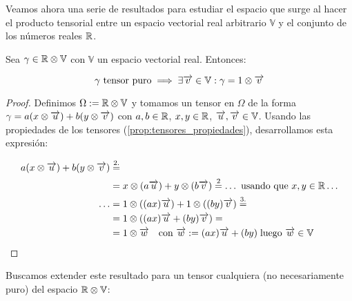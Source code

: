 Veamos ahora una serie de resultados para estudiar el espacio que surge al hacer el producto tensorial entre un espacio vectorial real arbitrario $\mathbb{V}$ y el conjunto de los números reales $\mathbb{R}$.

\begin{proposicion}
	Sea $\gamma \in \mathbb{R} \otimes \mathbb{V}$ con $\mathbb{V}$ un espacio vectorial real. Entonces:

	\begin{equation}
		\gamma \text{ tensor puro} \implies \exists \overrightarrow{v} \in \mathbb{V}: \gamma = 1 \otimes \overrightarrow{v}
	\end{equation}
\end{proposicion}

\begin{proof}
	Definimos $\Omega := \mathbb{R} \otimes \mathbb{V}$ y tomamos un tensor en $\Omega$ de la forma $\gamma = a(x \otimes \overrightarrow{u}) + b(y \otimes \overrightarrow{v})$ con $a, b \in \mathbb{R}$, $x, y \in \mathbb{R}$, $\overrightarrow{u}, \overrightarrow{v} \in \mathbb{V}$. Usando las propiedades de los tensores (\ref{prop:tensores_propiedades}), desarrollamos esta expresión:

	\begin{equation}
		\begin{split}
			a(x \otimes \overrightarrow{u}) + b(y \otimes \overrightarrow{v}) &\stackrel{\text{2.}}{=} \\
			&= x \otimes (a\overrightarrow{u}) + y \otimes (b\overrightarrow{v}) \stackrel{\text{2}}{=} \ldots \text{ usando que }  x,y \in \mathbb{R} \ldots \\
			\ldots &= 1 \otimes ((ax) \overrightarrow{u}) + 1 \otimes ((by) \overrightarrow{v}) \stackrel{\text{3.}}{=} \\
			&= 1 \otimes ((ax)\overrightarrow{u} + (by) \overrightarrow{v}) = \\
			&= 1 \otimes \overrightarrow{w} \quad \text{con } \overrightarrow{w} := (ax)\overrightarrow{u} + (by) \; \text{luego } \overrightarrow{w} \in \mathbb{V}
		\end{split}
	\end{equation}

\end{proof}

Buscamos extender este resultado para un tensor cualquiera (no necesariamente puro) del espacio $\mathbb{R} \otimes \mathbb{V}$:


